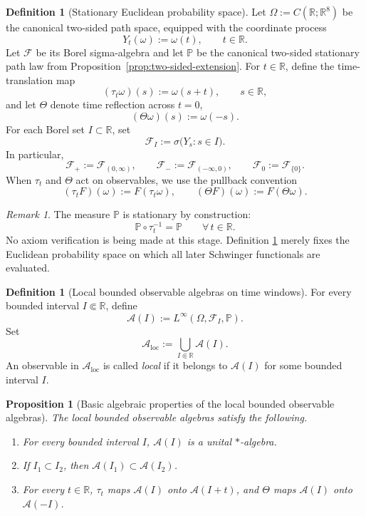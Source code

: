 \documentclass[11pt]{article}
\newtheorem{proposition}[theorem]{Proposition}
\theoremstyle{definition}
\newtheorem{definition}[theorem]{Definition}
\theoremstyle{remark}
\newtheorem{remark}[theorem]{Remark}
\newcommand{\R}{\mathbb R}
\newcommand{\mcA}{\mathcal A}
\newcommand{\mcF}{\mathcal F}
\begin{document}
\begin{definition}[Stationary Euclidean probability space]
\label{def:euclidean-space}
Let \(\Omega:=C(\R;\R^8)\) be the canonical two-sided path space, equipped with
the coordinate process
\[
Y_t(\omega):=\omega(t),
\qquad t\in\R.
\]
Let \(\mcF\) be its Borel sigma-algebra and let \(\mathbb P\) be the canonical
two-sided stationary path law from
Proposition~\ref{prop:two-sided-extension}.  For \(t\in\R\), define the
time-translation map
\[
(\tau_t\omega)(s):=\omega(s+t),
\qquad s\in\R,
\]
and let \(\Theta\) denote time reflection across \(t=0\),
\[
(\Theta\omega)(s):=\omega(-s).
\]
For each Borel set \(I\subset\R\), set
\[
\mcF_I:=\sigma\bigl(Y_s:s\in I\bigr).
\]
In particular,
\[
\mcF_+:=\mcF_{(0,\infty)},
\qquad
\mcF_-:=\mcF_{(-\infty,0)},
\qquad
\mcF_0:=\mcF_{\{0\}}.
\]
When \(\tau_t\) and \(\Theta\) act on observables, we use the pullback
convention
\[
(\tau_tF)(\omega):=F(\tau_t\omega),
\qquad
(\Theta F)(\omega):=F(\Theta\omega).
\]
\end{definition}

\begin{remark}
The measure \(\mathbb P\) is stationary by construction:
\[
\mathbb P\circ \tau_t^{-1}=\mathbb P
\qquad
\forall\,t\in\R.
\]
No axiom verification is being made at this stage.  Definition
\ref{def:euclidean-space} merely fixes the Euclidean probability space on which
all later Schwinger functionals are evaluated.
\end{remark}

\begin{definition}[Local bounded observable algebras on time windows]
\label{def:local-algebra}
For every bounded interval \(I\Subset\R\), define
\[
\mcA(I):=L^\infty(\Omega,\mcF_I,\mathbb P).
\]
Set
\[
\mcA_{\mathrm{loc}}:=\bigcup_{I\Subset\R}\mcA(I).
\]
An observable in \(\mcA_{\mathrm{loc}}\) is called \emph{local} if it belongs
to \(\mcA(I)\) for some bounded interval \(I\).
\end{definition}

\begin{proposition}[Basic algebraic properties of the local bounded observable algebras]
\label{prop:local-algebra}
The local bounded observable algebras satisfy the following.
\begin{enumerate}[label=\textnormal{(\roman*)},leftmargin=1.5em]
\item For every bounded interval \(I\), \(\mcA(I)\) is a unital \( * \)-algebra.
\item If \(I_1\subset I_2\), then \(\mcA(I_1)\subset\mcA(I_2)\).
\item For every \(t\in\R\), \(\tau_t\) maps \(\mcA(I)\) onto
\(\mcA(I+t)\), and \(\Theta\) maps \(\mcA(I)\) onto \(\mcA(-I)\).
\end{enumerate}
\end{proposition}
\end{document}
